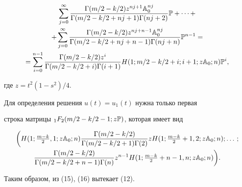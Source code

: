 \begin{pf}
\begin{multline}
\sum^\infty_{j=0} 


\frac{\Gamma(m/2-k/2)z^{nj+1}\Bbb A^{nj}_0} 


{\Gamma(m/2-k/2+nj+1)\Gamma(nj+2)}\Bbb P+\dotsb+ \\ 


% 


+\sum^\infty_{j=0} 


\frac{\Gamma(m/2-k/2)z^{nj+n-1}\Bbb A^{nj}_0} 


{\Gamma(m/2-k/2+nj+n-1)\Gamma(nj+n)}\Bbb P^{n-1}= \\


% 


=\sum^{n-1}_{i=0}\frac{\Gamma(m/2-k/2)z^i} 


{\Gamma(m/2-k/2+i)\Gamma(i+1)} 


H(1;m/2-k/2+i;i+1;z\Bbb A_0;n)\Bbb P^i, 


\end{multline} 


где $z=t^2(1-s^2)/4$. 


 


Для определения решения $u(t)=u_1(t)$ нужна только первая 


строка матрицы ${}_1F_2(m/2-k/2-1;z\Bbb P)$, которая имеет вид 


\begin{multline*} 


\bigg(H(1;\tfrac{m-k}{2},1;z\Bbb A_0;n) 


\frac{\Gamma(m/2-k/2)}{\Gamma(m/2-k/2+1)\Gamma(2)} 


z H(1;\tfrac{m-k}{2}+1,2;z\Bbb A_0;n);\dotsc; \\ 


% 


\frac{\Gamma(m/2-k/2)}{\Gamma(m/2-k/2+n-1)\Gamma(n)} 


z^{n-1}H(1;\tfrac{m-k}{2}+n-1,n;z\Bbb A_0;n)\bigg). 


\end{multline*} 


 


Таким образом, из (15), (16) вытекает (12). 


\end{pf} 


 


